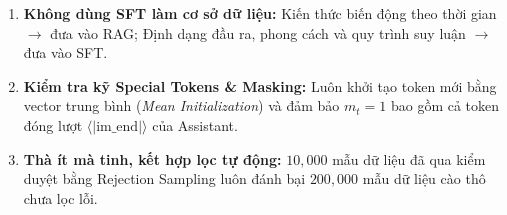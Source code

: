 \begin{engtakeaway}
\begin{enumerate}[leftmargin=1.2cm]
    \item \textbf{Không dùng SFT làm cơ sở dữ liệu:} Kiến thức biến động theo thời gian $\to$ đưa vào RAG; Định dạng đầu ra, phong cách và quy trình suy luận $\to$ đưa vào SFT.
    \item \textbf{Kiểm tra kỹ Special Tokens \& Masking:} Luôn khởi tạo token mới bằng vector trung bình (\textit{Mean Initialization}) và đảm bảo $m_t = 1$ bao gồm cả token đóng lượt $\langle|\text{im\_end}|\rangle$ của Assistant.
    \item \textbf{Thà ít mà tinh, kết hợp lọc tự động:} $10,000$ mẫu dữ liệu đã qua kiểm duyệt bằng Rejection Sampling luôn đánh bại $200,000$ mẫu dữ liệu cào thô chưa lọc lỗi.
\end{enumerate}
\end{engtakeaway}
